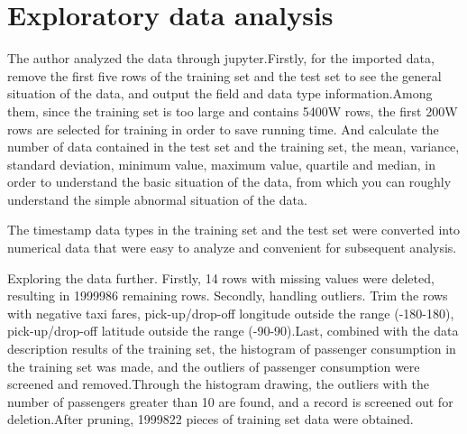 



\section{Exploratory data analysis} \label{sec-preliminaries}



The author analyzed the data through jupyter.Firstly, for the imported data, remove the first five rows of the training set and the test set to see the general situation of the data, and output the field and data type information.Among them, since the training set is too large and contains 5400W rows, the first 200W rows are selected for training in order to save running time. And calculate the number of data contained in the test set and the training set, the mean, variance, standard deviation, minimum value, maximum value, quartile and median, in order to understand the basic situation of the data, from which you can roughly understand the simple abnormal situation of the data.

The timestamp data types in the training set and the test set were converted into numerical data that were easy to analyze and convenient for subsequent analysis.

Exploring the data further. Firstly, 14 rows with missing values were deleted, resulting in 1999986 remaining rows. Secondly, handling outliers. Trim the rows with negative taxi fares, pick-up/drop-off longitude outside the range (-180-180), pick-up/drop-off latitude outside the range (-90-90).Last, combined with the data description results of the training set, the histogram of passenger consumption in the training set was made, and the outliers of passenger consumption were screened and removed.Through the histogram drawing, the outliers with the number of passengers greater than 10 are found, and a record is screened out for deletion.After pruning, 1999822 pieces of training set data were obtained.


